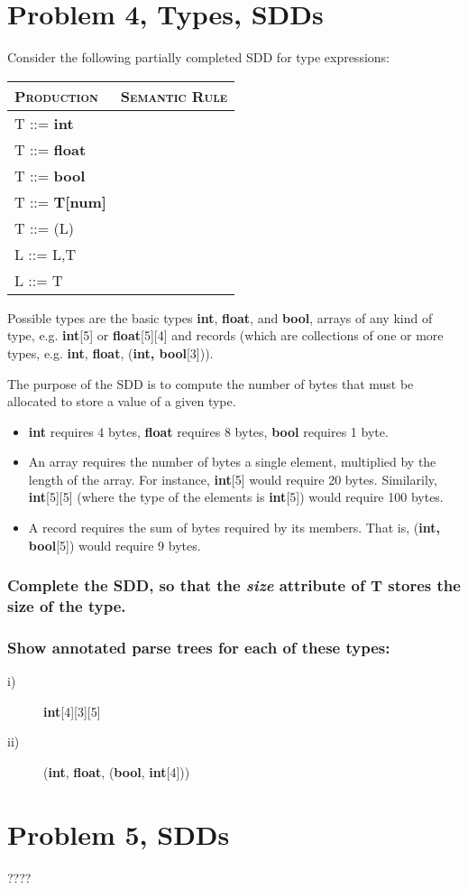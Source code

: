 \section{Problem 4, Types, SDDs}
Consider the following partially completed SDD for type expressions:
\begin{table}[H]
\begin{tabular}{ll}
	\textsc{Production} & \textsc{Semantic Rule} \\ \hline
	T ::= \textbf{int}	&						\\
	T ::= \textbf{float}& \\
	T ::= \textbf{bool} & \\
	T ::= \textbf{T[num]}& \\
	T ::= (L) 			& \\
	L ::= L,T			& \\
	L ::= T				& \\
\end{tabular}
\end{table}

Possible types are the basic types \textbf{int}, \textbf{float}, and \textbf{bool}, arrays of any kind of type, e.g. \textbf{int}[5] or \textbf{float}[5][4] and records (which are collections of one or more types, e.g. \textbf{int}, \textbf{float}, (\textbf{int, bool}[3])).

The purpose of the SDD is to compute the number of bytes that must be allocated to store a value of a given type.
\begin{itemize}
	\item \textbf{int} requires 4 bytes, \textbf{float} requires 8 bytes, \textbf{bool} requires 1 byte.
	\item An array requires the number of bytes a single element, multiplied by the length of the array. For instance, \textbf{int}[5] would require 20 bytes. Similarily, \textbf{int}[5][5] (where the type of the elements is \textbf{int}[5]) would require 100 bytes.
	\item A record requires the sum of bytes required by its members. That is, (\textbf{int, bool}[5]) would require 9 bytes.
\end{itemize}

\subsubsection{Complete the SDD, so that the \textit{size} attribute of T stores the size of the type.}

\subsubsection{Show annotated parse trees for each of these types:}
\begin{description}
	\item[i)] \textbf{int}[4][3][5]
	\item[ii)] (\textbf{int}, \textbf{float}, (\textbf{bool}, \textbf{int}[4]))

\end{description}

\newpage
\section{Problem 5, SDDs}
????
